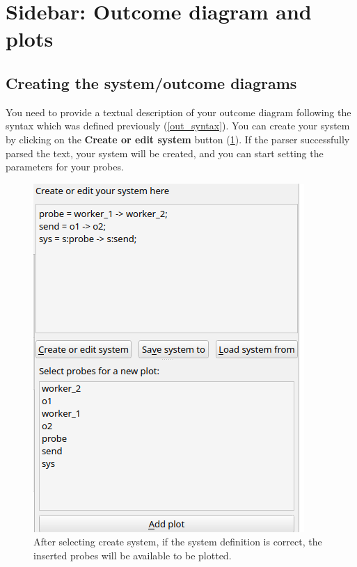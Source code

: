 \section{Sidebar: Outcome diagram and plots}

    \subsection{Creating the system/outcome diagrams}

    You need to provide a textual description of your outcome diagram following the syntax which was defined previously (\cref{out_syntax}).
    You can create your system by clicking on the \textbf{Create or edit system} button (\cref{fig:savsys}). If the parser successfully parsed the text, your system will be created, and you can start setting the parameters for your probes.
    
    \begin{figure}[H]
        \begin{center}
            \includegraphics[width = \textwidth]{img/manual/after_create.png}
        \end{center}
        \caption{After selecting create system, if the system definition is correct, the inserted probes will be available to be plotted.}
        \label{fig:savsys}
    \end{figure}

